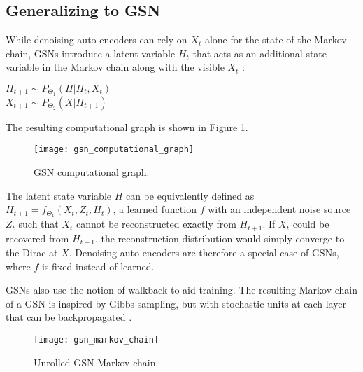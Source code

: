 \subsection{Generalizing to GSN}

While denoising auto-encoders can rely on \(X_t\) alone for the state of the Markov chain, GSNs introduce a latent variable \(H_t\) that acts as an additional state variable in the Markov chain along with the visible \(X_t\) \cite{gsn}:

 \(H_{t+1} \sim P_{\Theta_1}(H|H_t, X_t)\)\\
 \(X_{t+1} \sim  P_{\Theta_2}(X|H_{t+1})\)

The resulting computational graph is shown in Figure 1.
\begin{figure}[h!]
  \centering
    \texttt{[image: gsn\_computational\_graph]}
\caption{GSN computational graph.}
\end{figure}

The latent state variable \(H\) can be equivalently defined as \(H_{t+1} = f_{\Theta_1}(X_t,Z_t,H_t)\), a learned function \(f\) with an independent noise source \(Z_t\) such that \(X_t\) cannot be reconstructed exactly from \(H_{t+1}\). If \(X_t\) could be recovered from \(H_{t+1}\), the reconstruction distribution would simply converge to the Dirac at \(X\). Denoising auto-encoders are therefore a special case of GSNs, where \(f\) is fixed instead of learned.

GSNs also use the notion of walkback to aid training. The resulting Markov chain of a GSN is inspired by Gibbs sampling, but with stochastic units at each layer that can be backpropagated \cite{rezende14}.

\begin{figure}[h!]
  \centering
    \texttt{[image: gsn\_markov\_chain]}
\caption{Unrolled GSN Markov chain.}
\end{figure}
